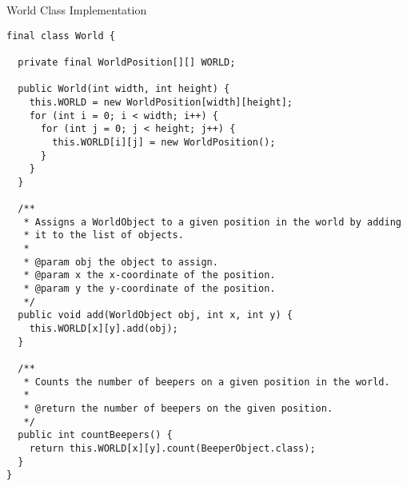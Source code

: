 \begin{cl}{World Class Implementation}
\begin{lstlisting}[language=MyJava]
final class World {
  
  private final WorldPosition[][] WORLD;

  public World(int width, int height) {
    this.WORLD = new WorldPosition[width][height];
    for (int i = 0; i < width; i++) {
      for (int j = 0; j < height; j++) {
        this.WORLD[i][j] = new WorldPosition();
      }
    }
  }

  /**
   * Assigns a WorldObject to a given position in the world by adding
   * it to the list of objects.
   * 
   * @param obj the object to assign.
   * @param x the x-coordinate of the position.
   * @param y the y-coordinate of the position.
   */
  public void add(WorldObject obj, int x, int y) {
    this.WORLD[x][y].add(obj);
  }

  /**
   * Counts the number of beepers on a given position in the world.
   * 
   * @return the number of beepers on the given position.
   */
  public int countBeepers() {
    return this.WORLD[x][y].count(BeeperObject.class);
  }
}
\end{lstlisting}
\end{cl}

